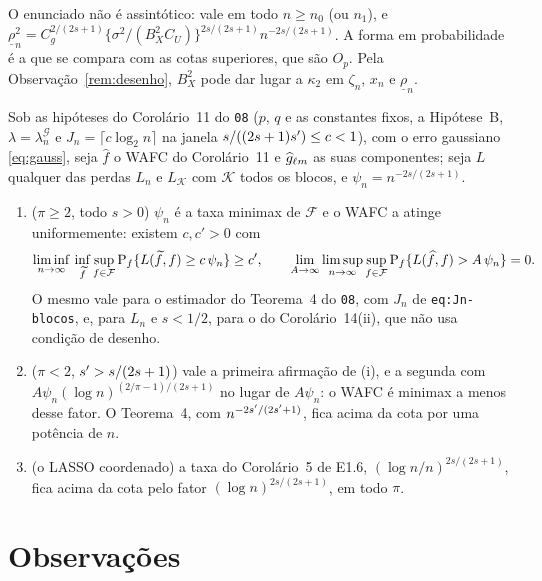 \documentclass[11pt,a4paper]{article}
\newcommand{\Kcal}{\mathcal{K}}
\newcommand{\Fcal}{\mathcal{F}}
\newcommand{\rlow}{\underline{\rho}_{n}}
\newcommand{\lamG}{\lambda^{\mathcal{G}}_{n}}
\begin{document}
O enunciado não é assintótico: vale em todo $n \ge n_{0}$ (ou $n_{1}$), e
$\rlow^{2} = C_{g}^{2/(2s+1)}\{\sigma^{2}/(B_{X}^{2}C_{U})\}^{2s/(2s+1)}
n^{-2s/(2s+1)}$. A forma em probabilidade é a que se compara com as cotas
superiores, que são $O_{p}$. Pela Observação~\ref{rem:desenho}, $B_{X}^{2}$
pode dar lugar a $\kappa_{2}$ em $\zeta_{n}$, $x_{n}$ e $\rlow$.

\begin{corollary}\label{cor:minimax}
Sob as hipóteses do Corolário~11 do \texttt{08} ($p$, $q$ e as constantes
fixos, a Hipótese~B, $\lambda = \lamG$ e $J_{n} = \lceil c\log_{2}n\rceil$
na janela $s/((2s+1)s') \le c < 1$), com o erro gaussiano
\eqref{eq:gauss}, seja $\widehat f$ o WAFC do Corolário~11 e $\widehat
g_{\ell m}$ as suas componentes; seja $L$ qualquer das perdas $L_{n}$ e
$L_{\Kcal}$ com $\Kcal$ todos os blocos, e $\psi_{n} = n^{-2s/(2s+1)}$.
\begin{enumerate}[label=\textup{(\roman*)}, leftmargin=*]
  \item \textup{($\pi \ge 2$, todo $s > 0$)} $\psi_{n}$ é a taxa minimax de
    $\Fcal$ e o WAFC a atinge uniformemente: existem $c, c' > 0$ com
    \[
      \liminf_{n\to\infty}\,\inf_{\widetilde f}\sup_{f\in\Fcal}
      \Prob_{f}\{L(\widetilde f,f) \ge c\,\psi_{n}\} \ge c',
      \qquad
      \lim_{A\to\infty}\limsup_{n\to\infty}\sup_{f\in\Fcal}
      \Prob_{f}\{L(\widehat f,f) > A\,\psi_{n}\} = 0 .
    \]
    O mesmo vale para o estimador do Teorema~4 do \texttt{08}, com $J_{n}$
    de \texttt{eq:Jn-blocos}, e, para $L_{n}$ e $s < 1/2$, para o do
    Corolário~14(ii), que não usa condição de desenho.
  \item \textup{($\pi < 2$, $s' > s/(2s+1)$)} vale a primeira afirmação de
    (i), e a segunda com $A\psi_{n}(\log n)^{(2/\pi-1)/(2s+1)}$ no lugar de
    $A\psi_{n}$: o WAFC é minimax a menos desse fator. O Teorema~4, com
    $n^{-2s'/(2s'+1)}$, fica acima da cota por uma potência de $n$.
  \item \textup{(o LASSO coordenado)} a taxa do Corolário~5 de E1.6,
    $(\log n/n)^{2s/(2s+1)}$, fica acima da cota pelo fator
    $(\log n)^{2s/(2s+1)}$, em todo $\pi$.
\end{enumerate}
\end{corollary}

\section{Observações}
\end{document}
